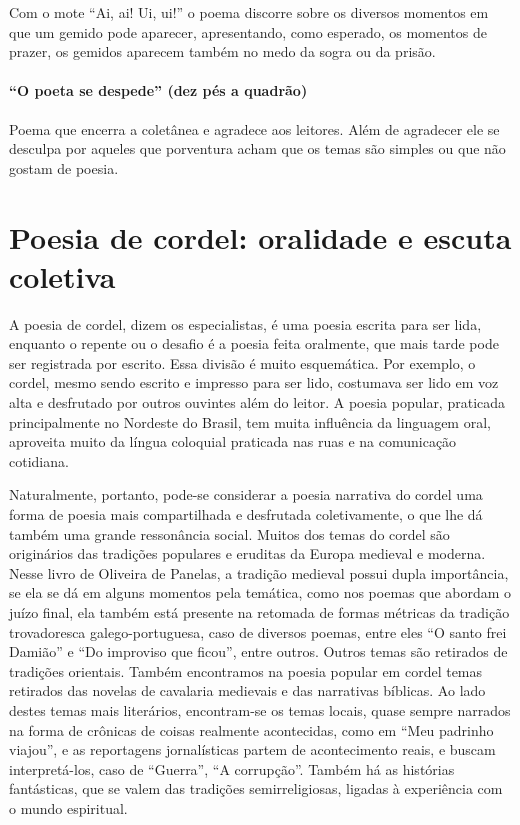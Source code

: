 Com o mote ``Ai, ai! Ui, ui!'' o
poema discorre sobre os diversos momentos em que um gemido pode
aparecer, apresentando, como esperado, os momentos de prazer, os gemidos
aparecem também no medo da sogra ou da prisão.

\paragraph{``O poeta se despede'' (dez pés a quadrão)}

Poema que encerra a coletânea e agradece aos leitores. 
Além de agradecer ele se desculpa por aqueles que porventura 
acham que os temas são simples ou que não gostam de poesia.

\section{Poesia de cordel: oralidade e escuta coletiva} 

A poesia de cordel, dizem os especialistas, é uma poesia escrita para
ser lida, enquanto o repente ou o desafio é a poesia feita oralmente,
que mais tarde pode ser registrada por escrito. Essa divisão é muito
esquemática. Por exemplo, o cordel, mesmo sendo escrito e impresso para
ser lido, costumava ser lido em voz alta e desfrutado por outros
ouvintes além do leitor. A poesia popular, praticada principalmente no
Nordeste do Brasil, tem muita influência da linguagem oral, aproveita
muito da língua coloquial praticada nas ruas e na comunicação
cotidiana. 

Naturalmente, portanto, pode-se considerar a poesia narrativa do cordel
uma forma de poesia mais compartilhada e desfrutada coletivamente, o
que lhe dá também uma grande ressonância social. Muitos dos temas do
cordel são originários das tradições populares e eruditas da Europa
medieval e moderna. Nesse livro de Oliveira de Panelas, a tradição
medieval possui dupla importância, se ela se dá em alguns momentos pela
temática, como nos poemas que abordam o juízo final, ela também está
presente na retomada de formas métricas da tradição
trovadoresca galego-portuguesa, caso de diversos poemas, entre eles
``O santo frei Damião'' e ``Do improviso que ficou'', entre
outros. Outros temas são retirados de tradições orientais. 
Também encontramos na poesia popular em cordel temas
retirados das novelas de cavalaria medievais e das narrativas bíblicas.
Ao lado destes temas mais literários, encontram-se os temas locais,
quase sempre narrados na forma de crônicas de coisas realmente
acontecidas, como em ``Meu padrinho
viajou'', e as reportagens jornalísticas partem de
acontecimento reais, e buscam interpretá-los, caso de
``Guerra'', ``A corrupção''. Também há as histórias fantásticas,
que se valem das tradições semirreligiosas, ligadas à experiência com o
mundo espiritual. 

